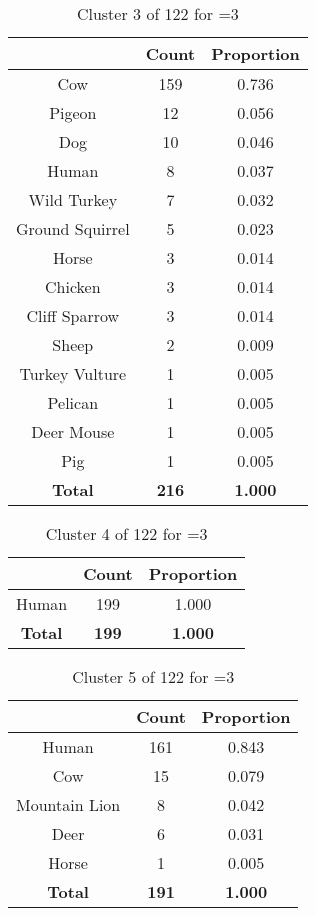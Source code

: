 \begin{table}[ht!]
\centering
\begin{tabular}{|c|c|c|}
\hline
\bf \Spec{} &\bf Count &\bf Proportion\\ \hline \hline
Cow & 159 & 0.736\\ \hline
Pigeon & 12 & 0.056\\ \hline
Dog & 10 & 0.046\\ \hline
Human & 8 & 0.037\\ \hline
Wild Turkey & 7 & 0.032\\ \hline
Ground Squirrel & 5 & 0.023\\ \hline
Horse & 3 & 0.014\\ \hline
Chicken & 3 & 0.014\\ \hline
Cliff Sparrow & 3 & 0.014\\ \hline
Sheep & 2 & 0.009\\ \hline
Turkey Vulture & 1 & 0.005\\ \hline
Pelican & 1 & 0.005\\ \hline
Deer Mouse & 1 & 0.005\\ \hline
Pig & 1 & 0.005\\ \hline
\hline
\bf Total & \bf 216 & \bf 1.000\\ \hline
\end{tabular}
\label{tab:cluster:3:3}
\caption{Cluster 3 of 122 for \minneigh{}=3}
\end{table}

\begin{table}[ht!]
\centering
\begin{tabular}{|c|c|c|}
\hline
\bf \Spec{} &\bf Count &\bf Proportion\\ \hline \hline
Human & 199 & 1.000\\ \hline
\hline
\bf Total & \bf 199 & \bf 1.000\\ \hline
\end{tabular}
\label{tab:cluster:4:3}
\caption{Cluster 4 of 122 for \minneigh{}=3}
\end{table}

\begin{table}[ht!]
\centering
\begin{tabular}{|c|c|c|}
\hline
\bf \Spec{} &\bf Count &\bf Proportion\\ \hline \hline
Human & 161 & 0.843\\ \hline
Cow & 15 & 0.079\\ \hline
Mountain Lion & 8 & 0.042\\ \hline
Deer & 6 & 0.031\\ \hline
Horse & 1 & 0.005\\ \hline
\hline
\bf Total & \bf 191 & \bf 1.000\\ \hline
\end{tabular}
\label{tab:cluster:5:3}
\caption{Cluster 5 of 122 for \minneigh{}=3}
\end{table}

